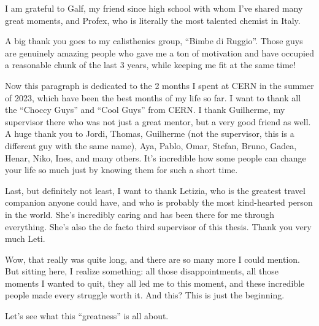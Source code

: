 \documentclass[12pt,a4paper,openright,twoside]{report}
\begin{document}
I am grateful to Galf, my friend since high school with whom I've shared many great moments, and Profex, who is literally the most talented chemist in Italy.

A big thank you goes to my calisthenics group, ``Bimbe di Ruggio''. Those guys are genuinely amazing people who gave me a ton of motivation and have occupied a reasonable chunk of the last 3 years, while keeping me fit at the same time!

Now this paragraph is dedicated to the 2 months I spent at CERN in the summer of 2023, which have been the best months of my life so far. I want to thank all the ``Choccy Guys'' and ``Cool Guys'' from CERN. I thank Guilherme, my supervisor there who was not just a great mentor, but a very good friend as well. A huge thank you to Jordi, Thomas, Guilherme (not the supervisor, this is a different guy with the same name), Aya, Pablo, Omar, Stefan, Bruno, Gadea, Henar, Niko, Ines, and many others. It's incredible how some people can change your life so much just by knowing them for such a short time.

Last, but definitely not least, I want to thank Letizia, who is the greatest travel companion anyone could have, and who is probably the most kind-hearted person in the world. She's incredibly caring and has been there for me through everything. She's also the de facto third supervisor of this thesis. Thank you very much Leti.

Wow, that really was quite long, and there are so many more I could mention. But sitting here, I realize something: all those disappointments, all those moments I wanted to quit, they all led me to this moment, and these incredible people made every struggle worth it. And this? This is just the beginning.

Let's see what this ``greatness'' is all about.
\end{document}

